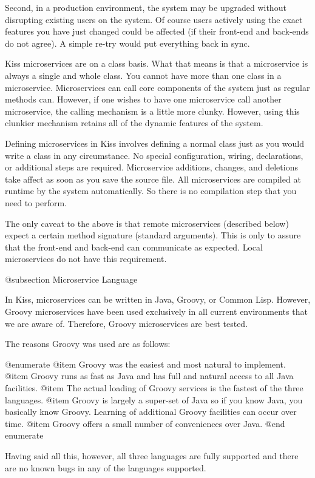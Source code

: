 Second, in a production environment, the system may be upgraded
without disrupting existing users on the system.  Of course users
actively using the exact features you have just changed could be
affected (if their front-end and back-ends do not agree).
A simple re-try would put everything back in sync.

Kiss microservices are on a class basis.  What that means is that a
microservice is always a single and whole class.  You cannot have more
than one class in a microservice.  Microservices can call
core components of the system just as regular methods can.  However,
if one wishes to have one microservice call another microservice,
the calling mechanism is a little more clunky.  However, using this
clunkier mechanism retains all of the dynamic features of the system.

Defining microservices in Kiss involves defining a normal class just
as you would write a class in any circumstance.  No special
configuration, wiring, declarations, or additional steps are required.
Microservice additions, changes, and deletions take affect as soon as
you save the source file.  All microservices are compiled at runtime
by the system automatically.  So there is no compilation step that
you need to perform.

The only caveat to the above is that remote microservices (described
below) expect a certain method signature (standard arguments).  This
is only to assure that the front-end and back-end can communicate as
expected.  Local microservices do not have this requirement.

@subsection Microservice Language

In Kiss, microservices can be written in Java, Groovy, or Common Lisp.
However, Groovy microservices have been used exclusively in all
current environments that we are aware of.  Therefore, Groovy
microservices are best tested.

The reasons Groovy was used are as follows:

@enumerate
@item
Groovy was the easiest and most natural to implement.
@item
Groovy runs as fast as Java and has full and natural access to all 
Java facilities.
@item
The actual loading of Groovy services is the fastest of the three languages.
@item
Groovy is largely a super-set of Java so if you know Java, you basically
know Groovy.  Learning of additional Groovy facilities can occur over
time.
@item
Groovy offers a small number of conveniences over Java.
@end enumerate

Having said all this, however, all three languages are fully supported
and there are no known bugs in any of the languages supported.

